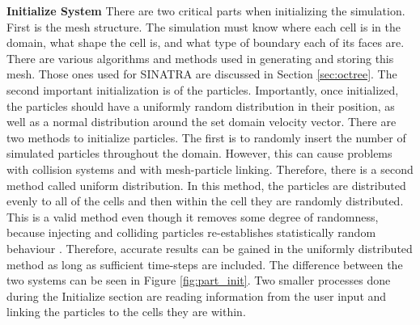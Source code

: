 \indent \textbf{Initialize System} There are two critical parts when initializing the simulation. First is the mesh structure. The simulation must know where each cell is in the domain, what shape the cell is, and what type of boundary each of its faces are. There are various algorithms and methods used in generating and storing this mesh. Those ones used for SINATRA are discussed in Section \ref{sec:octree}. The second important initialization is of the particles. Importantly, once initialized, the particles should have a uniformly random distribution in their position, as well as a normal distribution around the set domain velocity vector. There are two methods to initialize particles. The first is to randomly insert the number of simulated particles throughout the domain. However, this can cause problems with collision systems and with mesh-particle linking. Therefore, there is a second method called uniform distribution. In this method, the particles are distributed evenly to all of the cells and then within the cell they are randomly distributed. This is a valid method even though it removes some degree of randomness, because injecting and colliding particles re-establishes statistically random behaviour \cite{bird_dsmc,Galvez2018a,mac_thesis}. Therefore, accurate results can be gained in the uniformly distributed method as long as sufficient time-steps are included. The difference between the two systems can be seen in Figure \ref{fig:part_init}. Two smaller processes done during the Initialize section are reading information from the user input and linking the particles to the cells they are within. \par


